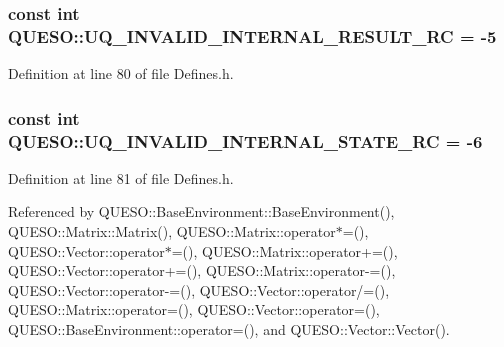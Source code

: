 \hypertarget{namespace_q_u_e_s_o_afd6363699eae2710081ad1642a03131e}{
\subsubsection[{U\-Q\-\_\-\-I\-N\-V\-A\-L\-I\-D\-\_\-\-I\-N\-T\-E\-R\-N\-A\-L\-\_\-\-R\-E\-S\-U\-L\-T\-\_\-\-R\-C}]{\setlength{\rightskip}{0pt plus 5cm}const int Q\-U\-E\-S\-O\-::\-U\-Q\-\_\-\-I\-N\-V\-A\-L\-I\-D\-\_\-\-I\-N\-T\-E\-R\-N\-A\-L\-\_\-\-R\-E\-S\-U\-L\-T\-\_\-\-R\-C = -\/5}}\label{namespace_q_u_e_s_o_afd6363699eae2710081ad1642a03131e}


Definition at line 80 of file Defines.\-h.

\hypertarget{namespace_q_u_e_s_o_ae093c8262be9961cc7297a84347c0c9e}{
\subsubsection[{U\-Q\-\_\-\-I\-N\-V\-A\-L\-I\-D\-\_\-\-I\-N\-T\-E\-R\-N\-A\-L\-\_\-\-S\-T\-A\-T\-E\-\_\-\-R\-C}]{\setlength{\rightskip}{0pt plus 5cm}const int Q\-U\-E\-S\-O\-::\-U\-Q\-\_\-\-I\-N\-V\-A\-L\-I\-D\-\_\-\-I\-N\-T\-E\-R\-N\-A\-L\-\_\-\-S\-T\-A\-T\-E\-\_\-\-R\-C = -\/6}}\label{namespace_q_u_e_s_o_ae093c8262be9961cc7297a84347c0c9e}


Definition at line 81 of file Defines.\-h.



Referenced by Q\-U\-E\-S\-O\-::\-Base\-Environment\-::\-Base\-Environment(), Q\-U\-E\-S\-O\-::\-Matrix\-::\-Matrix(), Q\-U\-E\-S\-O\-::\-Matrix\-::operator$\ast$=(), Q\-U\-E\-S\-O\-::\-Vector\-::operator$\ast$=(), Q\-U\-E\-S\-O\-::\-Matrix\-::operator+=(), Q\-U\-E\-S\-O\-::\-Vector\-::operator+=(), Q\-U\-E\-S\-O\-::\-Matrix\-::operator-\/=(), Q\-U\-E\-S\-O\-::\-Vector\-::operator-\/=(), Q\-U\-E\-S\-O\-::\-Vector\-::operator/=(), Q\-U\-E\-S\-O\-::\-Matrix\-::operator=(), Q\-U\-E\-S\-O\-::\-Vector\-::operator=(), Q\-U\-E\-S\-O\-::\-Base\-Environment\-::operator=(), and Q\-U\-E\-S\-O\-::\-Vector\-::\-Vector().

